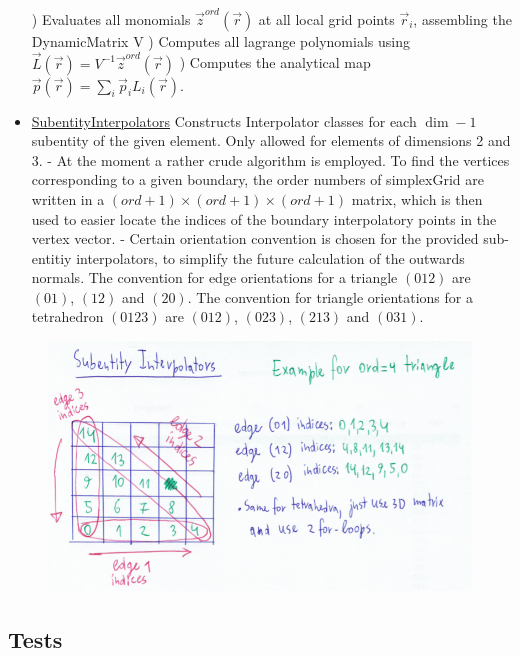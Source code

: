 \begin{itemize}
		) Evaluates all monomials $\vec{z}^{ord}(\vec{r})$ at all local grid points $\vec{r}_i$, assembling the DynamicMatrix V
		) Computes all lagrange polynomials using $\vec{L}(\vec{r}) = V^{-1} \vec{z}^{ord}(\vec{r})$
		) Computes the analytical map $\vec{p}(\vec{r}) = \sum_i \vec{p}_i L_i (\vec{r})$.
	\item \uline{SubentityInterpolators} Constructs Interpolator classes for each $\dim - 1$ subentity of the given element. Only allowed for elements of dimensions 2 and 3.
		\subitem - At the moment a rather crude algorithm is employed. To find the vertices corresponding to a given boundary, the order numbers of simplexGrid are written in a $(ord + 1) \times (ord + 1) \times (ord + 1)$ matrix, which is then used to easier locate the indices of the boundary interpolatory points in the vertex vector.
		\subitem - Certain orientation convention is chosen for the provided sub-entitiy interpolators, to simplify the future calculation of the outwards normals. The convention for edge orientations for a triangle $(012)$ are $(01)$, $(12)$ and $(20)$. The convention for triangle orientations for a tetrahedron $(0123)$ are $(012)$, $(023)$, $(213)$ and $(031)$.
\end{itemize}

\begin{figure}[hp]
    \centering
    \includegraphics[scale=0.5]{doc-pics/pic-subentity-interpolators-method.png}
\end{figure}


\subsection{Tests}

